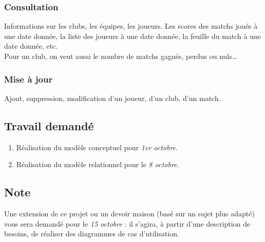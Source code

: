 \documentclass[a4,12pt]{article}
\begin{document}
\subsubsection*{Consultation}
Informations sur les clubs, les équipes, les joueurs. Les scores des matchs
joués à une date donnée, la liste des joueurs à une date donnée, la feuille du
match à une date donnée, etc.\\
Pour un club, on veut aussi le nombre de matchs gagnés, perdus ou nuls\ldots

\subsubsection*{Mise à jour}
Ajout, suppression, modification d'un joueur, d'un club, d'un match.

\subsection*{Travail demandé}
\begin{enumerate}
    \item Réalisation du modèle conceptuel pour \emph{1er octobre}.
    \item Réalisation du modèle relationnel pour le \emph{8 octobre}.
\end{enumerate}

\subsection*{Note}
Une extension de ce projet ou un devoir maison (basé sur un sujet plus adapté)
vous sera demandé pour le \emph{15 octobre} : il s'agira, à partir d'une
description de besoins, de réaliser des diagrammes de cas d'utilisation.
\end{document}

